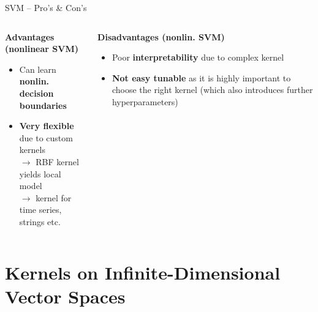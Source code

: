 \documentclass[11pt,compress,t,notes=noshow, xcolor=table]{beamer}
\begin{document}
\begin{vbframe}{SVM -- Pro's \& Con's}
\begin{columns}[T, totalwidth=\textwidth]
\begin{column}{0.5\textwidth}
  \end{column}
\end{columns}

\framebreak
\lz 

\begin{columns}[t, totalwidth=\textwidth]
  \begin{column}{0.5\textwidth}    
    \textbf{Advantages (nonlinear SVM)}
    \begin{itemize}
       \item Can learn \textbf{nonlin. decision boundaries}
       \item \textbf{Very flexible} due to custom kernels \\
       $\rightarrow$ RBF kernel yields local model \\
       $\rightarrow$ kernel for time series, strings etc.
    \end{itemize}
  \end{column}

  \begin{column}{0.5\textwidth}
    \textbf{Disadvantages (nonlin. SVM)}
    \begin{itemize}
       \item Poor \textbf{interpretability} due to complex kernel
       \item \textbf{Not easy tunable} as it is highly important to choose the right kernel (which also introduces further hyperparameters)
    \end{itemize}
  \end{column}
\end{columns}


\end{vbframe}



\section{Kernels on Infinite-Dimensional Vector Spaces}
\end{document}
